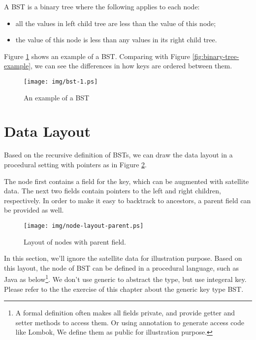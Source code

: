 \documentclass{article}
\begin{document}
A BST is a binary tree where the following applies to each node:
\begin{itemize}
\item all the values in left child tree are less than the value of this node;
\item the value of this node is less than any values in its right child tree.
\end{itemize}

Figure \ref{fig:bst-example} shows an example of a BST. Comparing with
Figure \ref{fig:binary-tree-example}, we can see the differences in how keys are
ordered between them.

\begin{figure}[htbp]
       \begin{center}
        \texttt{[image: img/bst-1.ps]}
        \caption{An example of a BST} \label{fig:bst-example}
       \end{center}
\end{figure}


\section{Data Layout}

Based on the recursive definition of BSTs, we can draw the
data layout in a procedural setting with pointers as in Figure
\ref{fig:node-layout-parent}.

The node first contains a field for the key, which can be augmented with satellite
data. The next two fields contain pointers to the left and right children, respectively. In order to make it easy to backtrack to ancestors, a parent field can be provided as well.

\begin{figure}[htbp]
       \begin{center}
        \texttt{[image: img/node-layout-parent.ps]}
        \caption{Layout of nodes with parent field.} \label{fig:node-layout-parent}
       \end{center}
\end{figure}

In this section, we'll ignore the satellite data for illustration purpose. Based on this layout, the node of BST can be defined in a procedural language, such as Java as below\footnote{A formal definition often makes all fields private, and provide getter and setter methods to access them. Or using annotation to generate access code like Lombok, We define them as public for illustration purpose.}. We don't use generic to abstract the type, but use integeral key. Please refer to the the exercise of this chapter about the generic key type BST.
\end{document}
